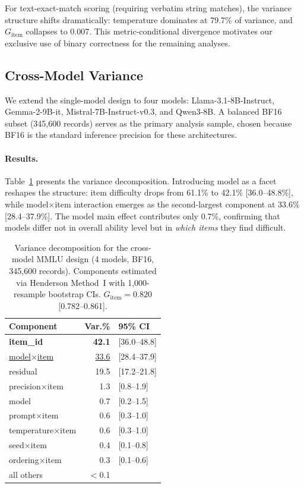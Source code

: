 For text-exact-match scoring (requiring verbatim string matches), the variance structure shifts dramatically: temperature dominates at 79.7\% of variance, and $G_\text{item}$ collapses to 0.007. This metric-conditional divergence motivates our exclusive use of binary correctness for the remaining analyses.

\subsection{Cross-Model Variance}

We extend the single-model design to four models: Llama-3.1-8B-Instruct, Gemma-2-9B-it, Mistral-7B-Instruct-v0.3, and Qwen3-8B. A balanced BF16 subset (345,600 records) serves as the primary analysis sample, chosen because BF16 is the standard inference precision for these architectures.

\paragraph{Results.} Table~\ref{tab:cross_model} presents the variance decomposition. Introducing model as a facet reshapes the structure: item difficulty drops from 61.1\% to 42.1\% [36.0--48.8\%], while model$\times$item interaction emerges as the second-largest component at 33.6\% [28.4--37.9\%]. The model main effect contributes only 0.7\%, confirming that models differ not in overall ability level but in \emph{which items} they find difficult.

\begin{table}[t]
\centering
\caption{Variance decomposition for the cross-model MMLU design (4 models, BF16, 345,600 records). Components estimated via Henderson Method~I with 1,000-resample bootstrap CIs. $G_\text{item} = 0.820$ [0.782--0.861].}
\label{tab:cross_model}
\small
\begin{tabular}{lrl}
\toprule
Component & Var.\% & 95\% CI \\
\midrule
\textbf{item\_id} & \textbf{42.1} & [36.0--48.8] \\
\underline{model$\times$item} & \underline{33.6} & [28.4--37.9] \\
residual & 19.5 & [17.2--21.8] \\
precision$\times$item & 1.3 & [0.8--1.9] \\
model & 0.7 & [0.2--1.5] \\
prompt$\times$item & 0.6 & [0.3--1.0] \\
temperature$\times$item & 0.6 & [0.3--1.0] \\
seed$\times$item & 0.4 & [0.1--0.8] \\
ordering$\times$item & 0.3 & [0.1--0.6] \\
all others & $<$0.1 & \\
\bottomrule
\end{tabular}
\end{table}

